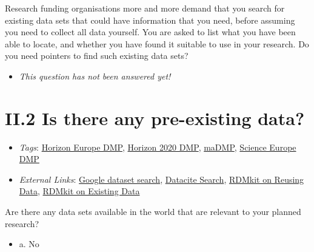 \documentclass[a4paper,12pt]{report}
\begin{document}
\noindent
\begin{markdown}
Research funding organisations more and more demand that you search for existing data sets that could have information that you need, before assuming you need to collect all data yourself. You are asked to list what you have been able to locate, and whether you have found it suitable to use in your research. Do you need pointers to find such existing data sets?
\end{markdown}



\begin{itemize}
  \item[\XSolidBrush] \textit{This question has not been answered yet!}
\end{itemize}
  


\section*{\protect\textcolor{colorSecId}{II.2} Is there any pre-existing data?}

\label{82fd0cce-2b41-423f-92ad-636d0872045c.efc80cc8-8318-4f8c-acb7-dc1c60e491c1}


\begin{itemize}
  \item \textit{Tags}: \ul{Horizon Europe DMP}, \ul{Horizon 2020 DMP}, \ul{maDMP}, \ul{Science Europe DMP}
  
  \item \textit{External Links}: \href{https://datasetsearch.research.google.com}{Google dataset search}, \href{https://search.datacite.org}{Datacite Search}, \href{https://rdmkit.elixir-europe.org/reusing}{RDMkit on Reusing Data}, \href{https://rdmkit.elixir-europe.org/existing_data.html}{RDMkit on Existing Data}\end{itemize}


\noindent
\begin{markdown}
Are there any data sets available in the world that are relevant to your planned research?
\end{markdown}



\begin{itemize}
  \item[\CheckmarkBold] a. No
\end{itemize}
\end{document}
